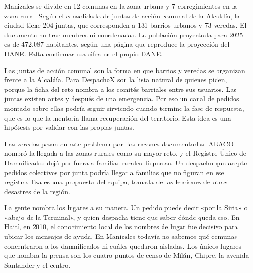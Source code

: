 Manizales se divide en 12 comunas en la zona urbana y 7 corregimientos en la zona rural. Según el consolidado de juntas de acción comunal de la Alcaldía, la ciudad tiene 204 juntas, que corresponden a 131 barrios urbanos y 73 veredas. El documento no trae nombres ni coordenadas. La población proyectada para 2025 es de 472.087 habitantes, según una página que reproduce la proyección del DANE. Falta confirmar esa cifra en el propio DANE.

Las juntas de acción comunal son la forma en que barrios y veredas se organizan frente a la Alcaldía. Para DespachoX son la lista natural de quienes piden, porque la ficha del reto nombra a los comités barriales entre sus usuarios. Las juntas existen antes y después de una emergencia. Por eso un canal de pedidos montado sobre ellas podría seguir sirviendo cuando termine la fase de respuesta, que es lo que la mentoría llama recuperación del territorio. Esta idea es una hipótesis por validar con las propias juntas.

Las veredas pesan en este problema por dos razones documentadas. ABACO nombró la llegada a las zonas rurales como su mayor reto, y el Registro Único de Damnificados dejó por fuera a familias rurales dispersas. Un despacho que acepte pedidos colectivos por junta podría llegar a familias que no figuran en ese registro. Esa es una propuesta del equipo, tomada de las lecciones de otros desastres de la región.

La gente nombra los lugares a su manera. Un pedido puede decir «por la Siria» o «abajo de la Terminal», y quien despacha tiene que saber dónde queda eso. En Haití, en 2010, el conocimiento local de los nombres de lugar fue decisivo para ubicar los mensajes de ayuda. En Manizales todavía no sabemos qué comunas concentraron a los damnificados ni cuáles quedaron aisladas. Los únicos lugares que nombra la prensa son los cuatro puntos de censo de Milán, Chipre, la avenida Santander y el centro.
